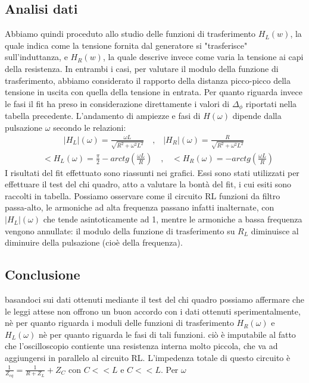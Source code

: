 \documentclass[a4paper]{article}
\begin{document}
\subsection{Analisi dati}
Abbiamo quindi proceduto allo studio delle funzioni di trasferimento $H_L(w)$, la quale indica come la tensione fornita dal generatore si "trasferisce" sull'induttanza, e $H_R(w)$, la quale descrive invece come varia la tensione ai capi della resistenza. In entrambi i casi, per valutare il modulo della funzione di trasferimento, abbiamo considerato il rapporto della distanza picco-picco della tensione in uscita con quella della tensione in entrata. Per quanto riguarda invece le fasi il fit ha preso in considerazione direttamente i valori di $\Delta_{\phi}$ riportati nella tabella precedente.
L'andamento di ampiezze e fasi di $H(\omega)$ dipende dalla pulsazione $\omega$ secondo le relazioni: 
\begin{align}
	 & |H_L|(\omega) = \frac{\omega L}{\sqrt{R^2 + \omega^2L^2}}  \quad \text{,} \quad |H_R|(\omega) = \frac{R}{\sqrt{R^2 + \omega^2L^2}}\quad \label{eq:ampiezza RL}
\end{align}
\begin{align}
	 & <H_L(\omega) = \frac{\pi}{2} -arctg(\frac{\omega L}{R})  \quad \text{,} \quad <H_R(\omega) = -arctg(\frac{\omega L}{R}) \label{eq:fasi RL}
\end{align}
I risultati del fit effettuato sono riassunti nei grafici.
Essi sono stati utilizzati per effettuare il test del chi quadro, atto a valutare la bontà del fit, i cui esiti sono raccolti in tabella.
Possiamo osservare come il circuito RL funzioni da filtro passa-alto, le armoniche ad alta frequenza passano infatti inalternate, con $|H_L|(\omega)$ che tende asintoticamente ad 1, mentre le armoniche a bassa frequenza vengono annullate: il modulo della funzione di trasferimento su $R_L$ diminuisce al diminuire della pulsazione (cioè della frequenza).


\subsection {Conclusione}
basandoci sui dati ottenuti mediante il test del chi quadro possiamo affermare che le leggi attese non offrono un buon accordo con i dati ottenuti sperimentalmente, nè per quanto riguarda i moduli delle funzioni di trasferimento $H_R(\omega)$ e $H_L(\omega)$ nè per quanto riguarda le fasi di tali funzioni. ciò è imputabile al fatto che l'oscilloscopio contiente una resistenza interna molto piccola, che va ad aggiungersi in parallelo al circuito RL. L'impedenza totale di questo circuito è $\frac{1}{Z_{eq}}=\frac{1}{R+Z_L}+Z_C$ con $C<<L$ e $C<<L$. Per $\omega$
\end{document}
